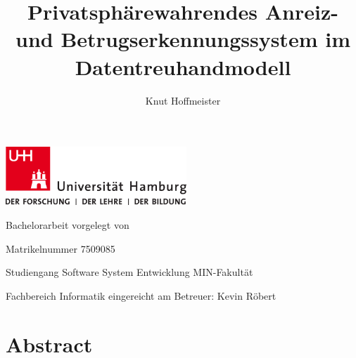 \documentclass[11pt,a4paper]{scrreprt}
\begin{document}
\title{Privatsphärewahrendes Anreiz- und Betrugserkennungssystem im Datentreuhandmodell}
\author{Knut Hoffmeister}

\begin{titlepage}
\includegraphics[width=6.8cm]{up-uhh-logo-u-2010-u-farbe-u-rgb.pdf}
\begin{center}
    \vfill
    \Large Bachelorarbeit
    \vfill
    \makeatletter
    {\Large\textsf{\textbf{\@title}}}
    \makeatother
    \vfill
    vorgelegt von
    \par\bigskip
    \makeatletter
    {\@author}
    \makeatother
    \par
    Matrikelnummer 7509085 \par
    Studiengang Software System Entwicklung
    \vfill
    MIN-Fakultät \par
    Fachbereich Informatik
    \vfill
    \makeatletter
    eingereicht am {\@date}
    \makeatother
    \vfill
    Betreuer: Kevin Röbert
\end{center}
\end{titlepage}

\restoregeometry

\tableofcontents


\chapter*{Abstract}


\end{document}
